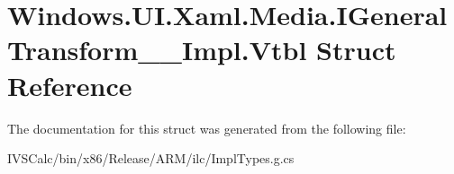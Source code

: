 \hypertarget{struct_windows_1_1_u_i_1_1_xaml_1_1_media_1_1_i_general_transform_____impl_1_1_vtbl}{}\section{Windows.\+U\+I.\+Xaml.\+Media.\+I\+General\+Transform\+\_\+\+\_\+\+Impl.\+Vtbl Struct Reference}
\label{struct_windows_1_1_u_i_1_1_xaml_1_1_media_1_1_i_general_transform_____impl_1_1_vtbl}


The documentation for this struct was generated from the following file\+:\begin{DoxyCompactItemize}
\item 
I\+V\+S\+Calc/bin/x86/\+Release/\+A\+R\+M/ilc/Impl\+Types.\+g.\+cs\end{DoxyCompactItemize}
